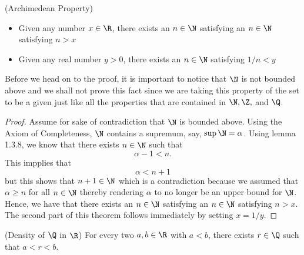 \begin{tcolorbox}
\begin{thm}(Archimedean Property)
    \begin{itemize}
        
        \item Given any number \( x \in \R \), there exists an \( n \in \N \) satisfying an \( n \in \N \) satisfying \( n > x \)
        \item Given any real number \( y > 0 \), there exists an \( n \in \N \) satisfying \( 1/n < y \)

    \end{itemize}
    
\end{thm}
\end{tcolorbox}

Before we head on to the proof, it is important to notice that \( \N \) is not bounded above and we shall not prove this fact since we are taking this property of the set to be a given just like all the properties that are contained in \( \N, \Z,\)  and \( \Q \). 

\begin{proof}
    Assume for sake of contradiction that \( \N \) is bounded above. Using the Axiom of Completeness, \( \N \) contains a supremum, say, \( \sup \N = \alpha \). Using lemma 1.3.8, we know that there exists \( n \in \N \) such that 
    \[  \alpha - 1 < n \tag{\( \epsilon = 1 \)}.\]
    This impplies that 
    \[ \alpha < n + 1 \]
    but this shows that \( n+1 \in \N \) which is a contradiction because we assumed that \( \alpha \geq n \) for all \( n \in \N \) thereby rendering \( \alpha \) to no longer be an upper bound for \( \N \). Hence, we have that 
    there exists an \( n \in \N \) satisfying an \( n \in \N \) satisfying \( n > x \).
    The second part of this theorem follows immediately by setting \( x = 1/y \).
\end{proof}

\begin{tcolorbox}
    \begin{thm}(Density of \( \Q \) in \( \R \))
        For every two \( a,b \in \R \) with \( a < b \), there exists \( r \in \Q \) such that \( a < r < b \).
    \end{thm}
\end{tcolorbox}


